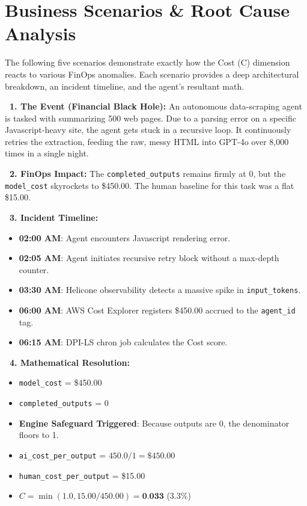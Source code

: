 \documentclass[11pt,a4paper]{article}
\begin{document}
\section{Business Scenarios \& Root Cause Analysis}

The following five scenarios demonstrate exactly how the Cost (C) dimension reacts to various FinOps anomalies. Each scenario provides a deep architectural breakdown, an incident timeline, and the agent's resultant math.

\begin{tcolorbox}[enhanced, colback=dpired!5!white, colframe=dpired, title={\textbf{\faExclamationCircle\ Scenario 1: The Infinite Hallucination Loop (Runaway Spend)}}, fonttitle=\bfseries, boxrule=1pt, arc=2mm, drop shadow]
\textbf{\color{dpired}\faFire\ 1. The Event (Financial Black Hole):} 
An autonomous data-scraping agent is tasked with summarizing 500 web pages. Due to a parsing error on a specific Javascript-heavy site, the agent gets stuck in a recursive loop. It continuously retries the extraction, feeding the raw, messy HTML into GPT-4o over 8,000 times in a single night.

\vspace{0.2cm}
\textbf{\color{dpiblue}\faMoneyBillWave\ 2. FinOps Impact:} 
The \texttt{completed\_outputs} remains firmly at $0$, but the \texttt{model\_cost} skyrockets to \$450.00. The human baseline for this task was a flat \$15.00. 

\vspace{0.2cm}
\textbf{\color{dpigreen}\faClock\ 3. Incident Timeline:}
\begin{itemize}
    \item \textbf{02:00 AM}: Agent encounters Javascript rendering error.
    \item \textbf{02:05 AM}: Agent initiates recursive retry block without a max-depth counter.
    \item \textbf{03:30 AM}: Helicone observability detects a massive spike in \texttt{input\_tokens}.
    \item \textbf{06:00 AM}: AWS Cost Explorer registers \$450.00 accrued to the \texttt{agent\_id} tag.
    \item \textbf{06:15 AM}: DPI-LS chron job calculates the Cost score.
\end{itemize}

\vspace{0.2cm}
\textbf{\color{dpiteal}\faCalculator\ 4. Mathematical Resolution:}
\begin{itemize}
    \item \texttt{model\_cost} = \$450.00
    \item \texttt{completed\_outputs} = 0
    \item \textbf{Engine Safeguard Triggered}: Because outputs are 0, the denominator floors to 1. 
    \item \texttt{ai\_cost\_per\_output} = $450.0 / 1 = \$450.00$
    \item \texttt{human\_cost\_per\_output} = \$15.00
    \item $C = \min(1.0, 15.00 / 450.00) = \textbf{0.033}$ (3.3\%)
\end{itemize}


\end{tcolorbox}
\end{document}
